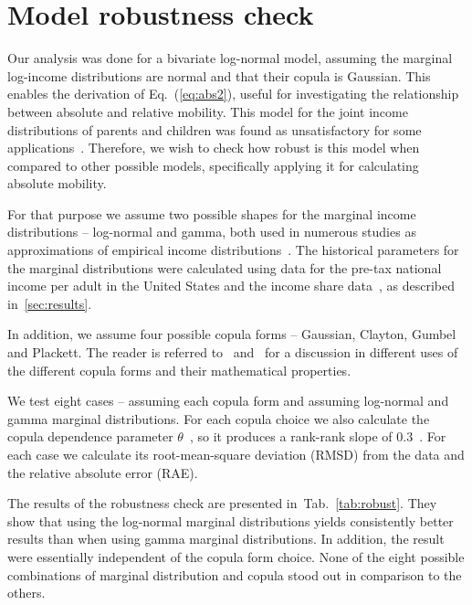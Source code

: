 \documentclass[12pt]{article}
\newcommand{\eref}[1]{Eq.~(\ref{eq:#1})}
\newcommand{\tref}[1]{Tab.~\ref{tab:#1}}
\numberwithin{equation}{section}
\begin{document}
\section{Model robustness check}
\label{app:appB}

Our analysis was done for a bivariate log-normal model, assuming the marginal log-income distributions are normal and that their copula is Gaussian. This enables the derivation of \eref{abs2}, useful for investigating the relationship between absolute and relative mobility. This model for the joint income distributions of parents and children was found as unsatisfactory for some applications~\citep{bonhomme2009assessing}. Therefore, we wish to check how robust is this model when compared to other possible models, specifically applying it for calculating absolute mobility.

For that purpose we assume two possible shapes for the marginal income distributions -- log-normal and gamma, both used in numerous studies as approximations of empirical income distributions~\citep{salem1974convenient,pinkovskiy2009parametric}. The historical parameters for the marginal distributions were calculated using data for the pre-tax national income per adult in the United States and the income share data~\citep{WID2017}, as described in~\ref{sec:results}.

In addition, we assume four possible copula forms -- Gaussian, Clayton, Gumbel and Plackett. The reader is referred to~\citet{trivedi2007copula} and~\citet{bonhomme2009assessing} for a discussion in different uses of the different copula forms and their mathematical properties.

We test eight cases -- assuming each copula form and assuming log-normal and gamma marginal distributions. For each copula choice we also calculate the copula dependence parameter $\theta$~\citep{trivedi2007copula}, so it produces a rank-rank slope of $0.3$~\citep{chetty2014land}. For each case we calculate its root-mean-square deviation (RMSD) from the data and the relative absolute error (RAE).

The results of the robustness check are presented in~\tref{robust}. They show that using the log-normal marginal distributions yields consistently better results than when using gamma marginal distributions. In addition, the result were essentially independent of the copula form choice. None of the eight possible combinations of marginal distribution and copula stood out in comparison to the others.
\end{document}
